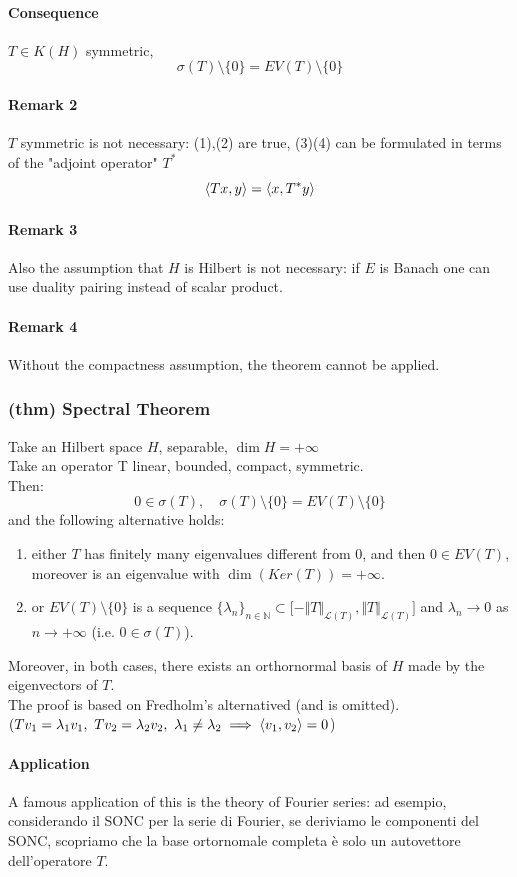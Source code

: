 \paragraph{Consequence}
$T\in K(H)$ symmetric,
$$\sigma(T)\setminus \{0\}=EV(T)\setminus \{0\}$$
\paragraph{Remark 2}
$T$ symmetric is not necessary: (1),(2) are true, (3)(4) can be formulated in terms of the "adjoint operator" $T^*$
$$\langle {Tx} , {y} \rangle=\langle {x} , {T^*y} \rangle$$
\paragraph{Remark 3}
Also the assumption that $H$ is Hilbert is not necessary: if $E$ is Banach one can use duality pairing instead of scalar product.
\paragraph{Remark 4} Without the compactness assumption, the theorem cannot be applied.
\subsubsection{(thm) Spectral Theorem}
Take an Hilbert space $H$, separable, $\dim H=+\infty$\\
Take an operator T linear, bounded, compact, symmetric.\\
Then:
$$0\in \sigma(T), \quad \sigma(T)\setminus\{0\}=EV(T)\setminus\{0\}$$
and the following alternative holds:
\begin{enumerate}
    \item either $T$ has finitely many eigenvalues different from 0, and then $0\in EV(T)$, moreover is an eigenvalue with $\dim(Ker(T))=+\infty$.
    \item or $EV(T)\setminus\{0\}$ is a sequence $\{\lambda_n\}_{n\in \mathbb N}\subset \Big [-\Vert T\Vert_{\mathcal L(T)},\Vert T\Vert_{\mathcal L(T)}\Big ]$ and $\lambda_n\to0$ as $n\to+\infty$ (i.e. $0\in \sigma (T)$).
\end{enumerate}
    Moreover, in both cases, there exists an orthornormal basis of $H$ made by the eigenvectors of $T$.\\
    The proof is based on Fredholm's alternatived (and is omitted).
    $(Tv_1=\lambda_1 v_1,\ Tv_2=\lambda_2v_2, \ \lambda_1\neq \lambda_2\implies \scalar{v_1}{v_2}=0$)
    \paragraph{Application} A famous application of this is the theory of Fourier series: ad esempio, considerando il SONC per la serie di Fourier, se deriviamo le componenti del SONC, scopriamo che la base ortornomale completa è solo un autovettore dell'operatore $T$.

